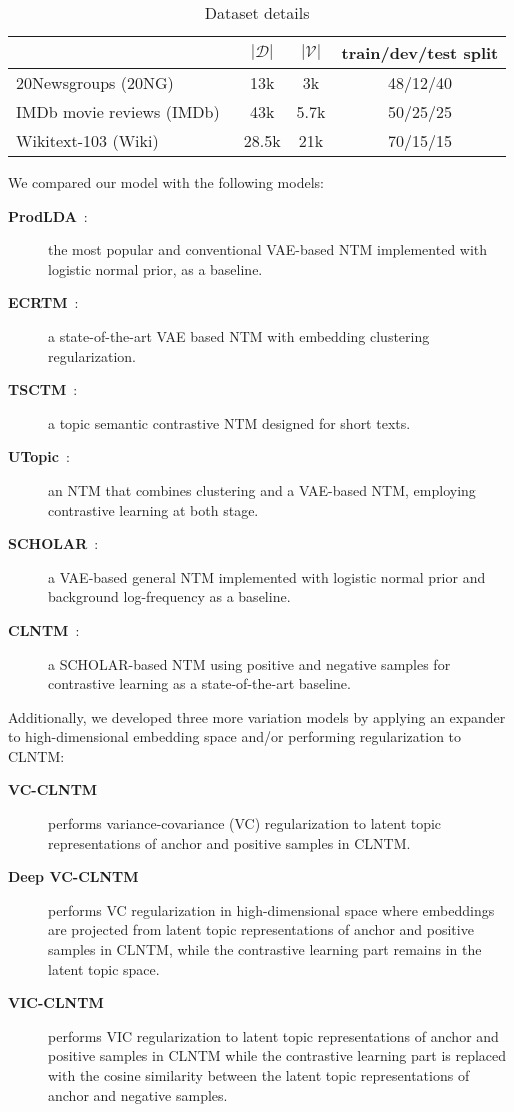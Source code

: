 \documentclass{article}
\begin{document}
\begin{table*}[ht]
    \caption{Dataset details}\label{tab:datasets}%
    \begin{tabular*}{\textwidth}{@{\extracolsep\fill}lccc}
    \toprule
    & $|\mathcal{D}|$   & $|\mathcal{V}|$   & train/dev/test split \\ \midrule
    20Newsgroups (20NG)~\cite{lang1995newsweeder}       & 13k & 3k  & 48/12/40             \\
    IMDb movie reviews (IMDb)~\cite{maas2011learning} & 43k & 5.7k  & 50/25/25             \\
    Wikitext-103 (Wiki)~\cite{merity2017pointer}       & 28.5k & 21k & 70/15/15             \\ \bottomrule
    \end{tabular*}
\end{table*}

We compared our model with the following models:
\begin{description}
\item[\rm{\textbf{ProdLDA}~\cite{srivastava2017autoencoding}:}] the most popular and conventional VAE-based NTM implemented with logistic normal prior, as a baseline.
\item[\rm{\textbf{ECRTM}~\cite{wu2023effective}:}] a state-of-the-art VAE based NTM with embedding clustering regularization. 
\item[\rm{\textbf{TSCTM}~\cite{wu2022mitigating}:}] a topic semantic contrastive NTM designed for short texts.
\item[\rm{\textbf{UTopic}~\cite{han2023unified}:}] an NTM that combines clustering and a VAE-based NTM, employing contrastive learning at both stage. 
\item[\rm{\textbf{SCHOLAR}~\cite{card2018neural}:}] a VAE-based general NTM implemented with logistic normal prior and background log-frequency as a baseline.
\item[\rm{\textbf{CLNTM}~\cite{nguyen2021contrastive}:}] a SCHOLAR-based NTM using positive and negative samples for contrastive learning as a state-of-the-art baseline.

\end{description}
Additionally, we developed three more variation models by applying an expander to high-dimensional embedding space and/or performing regularization to CLNTM:
\begin{description}
\item[\rm{\textbf{VC-CLNTM}}]performs variance-covariance (VC) regularization to latent topic representations of anchor and positive samples in CLNTM.
\item[\rm{\textbf{Deep VC-CLNTM}}]performs VC regularization in high-dimensional space where embeddings are projected from latent topic representations of anchor and positive samples in CLNTM, while the contrastive learning part remains in the latent topic space.
\item[\rm{\textbf{VIC-CLNTM}}]performs VIC regularization to latent topic representations of anchor and positive samples in CLNTM while the contrastive learning part is replaced with the cosine similarity between the latent topic representations of anchor and negative samples.
\end{description}
\end{document}
